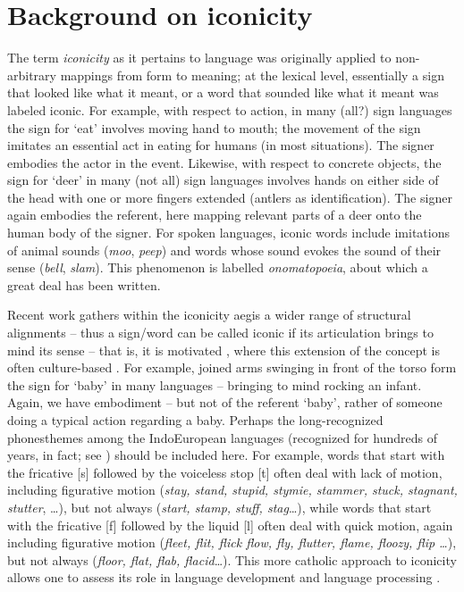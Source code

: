 \documentclass[output=paper,
modfonts
]{LSP/langsci}
\begin{document}
\section{Background on iconicity}

The term \emph{iconicity} as it pertains to language was originally
applied to non-arbitrary mappings from form to meaning; at the lexical
level, essentially a sign that looked like what it meant, or a word that
sounded like what it meant was labeled iconic. For example, with respect
to action, in many (all?) sign languages the sign for `eat' involves
moving hand to mouth; the movement of the sign imitates an essential act
in eating for humans (in most situations). The signer embodies the actor
in the event. Likewise, with respect to concrete objects, the sign for
`deer' in many (not all) sign languages involves hands on either side of
the head with one or more fingers extended (antlers as identification).
The signer again embodies the referent, here mapping relevant parts of a
deer onto the human body of the signer. For spoken languages, iconic
words include imitations of animal sounds (\emph{moo}, \emph{peep}) and
words whose sound evokes the sound of their sense (\emph{bell},
\emph{slam}). This phenomenon is labelled \emph{onomatopoeia}, about
which a great deal has been written.

Recent work gathers within the iconicity aegis a wider range of
structural alignments -- thus a sign/word can be called iconic if its
articulation brings to mind its sense -- that is, it is motivated \citep{russo2004,perniss2010}, where this extension of
the concept is often culture-based \citep{adam2007}. For example,
joined arms swinging in front of the torso form the sign for `baby' in
many languages -- bringing to mind rocking an infant. Again, we have
embodiment -- but not of the referent `baby', rather of someone doing a
typical action regarding a baby. Perhaps the long-recognized
phonesthemes among the IndoEuropean languages (recognized for hundreds
of years, in fact; see \citealt{drellishak2006}) should be included here. For
example, words that start with the fricative {[}s{]} followed by the
voiceless stop {[}t{]} often deal with lack of motion, including
figurative motion (\emph{stay, stand, stupid, stymie, stammer, stuck,
stagnant, stutter}, \ldots{}), but not always (\emph{start, stamp,
stuff, stag}\ldots{}), while words that start with the fricative {[}f{]}
followed by the liquid {[}l{]} often deal with quick motion, again
including figurative motion (\emph{fleet, flit, flick flow, fly,
flutter, flame, floozy, flip \ldots{}}), but not always (\emph{floor,
flat, flab, flacid}\ldots{}). This more catholic approach to iconicity
allows one to assess its role in language development and language
processing \citep{emmorey2014,perniss2014}.
\end{document}
